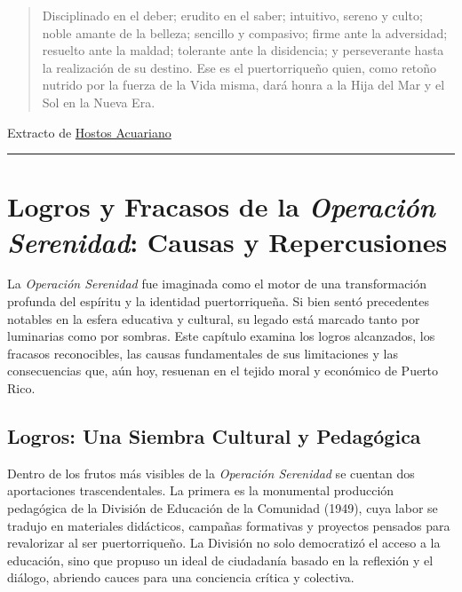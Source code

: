 \documentclass[
]{book}
\begin{document}
\begin{quote}
Disciplinado en el deber; erudito en el saber; intuitivo, sereno y culto; noble amante de la belleza; sencillo y compasivo; firme ante la adversidad; resuelto ante la maldad; tolerante ante la disidencia; y perseverante hasta la realización de su destino. Ese es el puertorriqueño quien, como retoño nutrido por la fuerza de la Vida misma, dará honra a la Hija del Mar y el Sol en la Nueva Era.
\end{quote}

Extracto de \href{https://aleph.ngsm.org/Hostos/1.html}{Hostos Acuariano}

\begin{center}\rule{0.5\linewidth}{0.5pt}\end{center}

\chapter{\texorpdfstring{Logros y Fracasos de la \emph{Operación Serenidad}: Causas y Repercusiones}{Logros y Fracasos de la Operación Serenidad: Causas y Repercusiones}}\label{logros-y-fracasos-de-la-operaciuxf3n-serenidad-causas-y-repercusiones}

La \emph{Operación Serenidad} fue imaginada como el motor de una transformación profunda del espíritu y la identidad puertorriqueña. Si bien sentó precedentes notables en la esfera educativa y cultural, su legado está marcado tanto por luminarias como por sombras. Este capítulo examina los logros alcanzados, los fracasos reconocibles, las causas fundamentales de sus limitaciones y las consecuencias que, aún hoy, resuenan en el tejido moral y económico de Puerto Rico.

\section{Logros: Una Siembra Cultural y Pedagógica}\label{logros-una-siembra-cultural-y-pedaguxf3gica}

Dentro de los frutos más visibles de la \emph{Operación Serenidad} se cuentan dos aportaciones trascendentales. La primera es la monumental producción pedagógica de la División de Educación de la Comunidad (1949), cuya labor se tradujo en materiales didácticos, campañas formativas y proyectos pensados para revalorizar al ser puertorriqueño. La División no solo democratizó el acceso a la educación, sino que propuso un ideal de ciudadanía basado en la reflexión y el diálogo, abriendo cauces para una conciencia crítica y colectiva.
\end{document}
